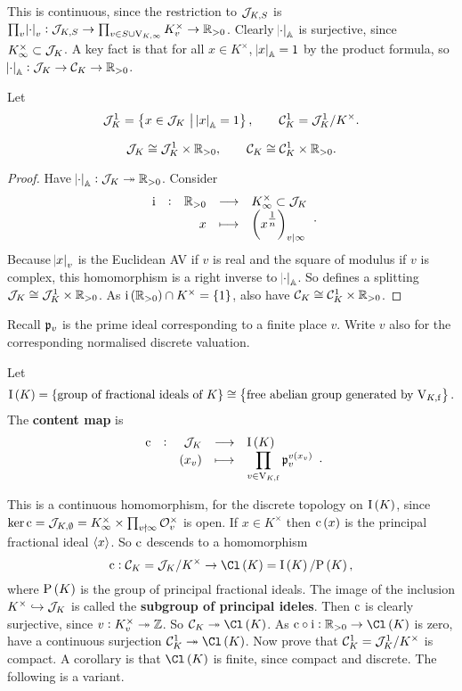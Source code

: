This is continuous, since the restriction to $ \mathcal{J}_{K, S} $ is $ \prod_v \abs{\cdot}_v : \mathcal{J}_{K, S} \to \prod_{v \in S \cup \mathrm{V}_{K, \infty}} K_v^\times \to \mathbb{R}_{> 0} $. Clearly $ \abs{\cdot}_{\mathbb{A}} $ is surjective, since $ K_\infty^\times \subset \mathcal{J}_K $. A key fact is that for all $ x \in K^\times $, $ \abs{x}_{\mathbb{A}} = 1 $ by the product formula, so $ \abs{\cdot}_{\mathbb{A}} : \mathcal{J}_K \to \mathcal{C}_K \to \mathbb{R}_{> 0} $.

\begin{definition*}
Let
$$ \JJJ_K^1 = \cbr{x \in \JJJ_K \st \abs{x}_\AA = 1}, \qquad \CCC_K^1 = \JJJ_K^1 / K^\times. $$
\end{definition*}

\begin{proposition}
$$ \mathcal{J}_K \cong \mathcal{J}_K^1 \times \mathbb{R}_{> 0}, \qquad \mathcal{C}_K \cong \mathcal{C}_K^1 \times \mathbb{R}_{> 0}. $$
\end{proposition}

\begin{proof}
Have $ \abs{\cdot}_{\mathbb{A}} : \mathcal{J}_K \twoheadrightarrow \mathbb{R}_{> 0} $. Consider
$$ \function[\i]{\RR_{> 0}}{K_\infty^\times \subset \JJJ_K}{x}{\br{x^{\tfrac{1}{n}}}_{v \mid \infty}}. $$
Because $ \abs{x}_v $ is the Euclidean AV if $ v $ is real and the square of modulus if $ v $ is complex, this homomorphism is a right inverse to $ \abs{\cdot}_{\mathbb{A}} $. So defines a splitting $ \mathcal{J}_K \cong \mathcal{J}_K^1 \times \mathbb{R}_{> 0} $. As $ \i\br{\RR_{> 0}} \cap K^\times = \cbr{1} $, also have $ \mathcal{C}_K \cong \mathcal{C}_K^1 \times \mathbb{R}_{> 0} $.
\end{proof}

Recall $ \mathfrak{p}_v $ is the prime ideal corresponding to a finite place $ v $. Write $ v $ also for the corresponding normalised discrete valuation.

\begin{definition*}
Let
$$ \I\br{K} = \cbr{\text{group of fractional ideals of} \ K} \cong \cbr{\text{free abelian group generated by} \ \V_{K, \f}}. $$
The \textbf{content map} is
$$ \function[\c]{\JJJ_K}{\I\br{K}}{\br{x_v}}{\prod_{v \in \V_{K, \f}} \ppp_v^{v\br{x_v}}}. $$
\end{definition*}

This is a continuous homomorphism, for the discrete topology on $ \I\br{K} $, since $ \ker \mathrm{c} = \mathcal{J}_{K, \emptyset} = K_\infty^\times \times \prod_{v \nmid \infty} \mathcal{O}_v^\times $ is open. If $ x \in K^\times $ then $ \c\br{x} $ is the principal fractional ideal $ \left\langle x \right\rangle $. So $ \mathrm{c} $ descends to a homomorphism
$$ \c : \CCC_K = \JJJ_K / K^\times \to \Cl\br{K} = \I\br{K} / \P\br{K}, $$
where $ \P\br{K} $ is the group of principal fractional ideals. The image of the inclusion $ K^\times \hookrightarrow \mathcal{J}_K $ is called the \textbf{subgroup of principal ideles}. Then $ \mathrm{c} $ is clearly surjective, since $ v : K_v^\times \twoheadrightarrow \mathbb{Z} $. So $ \CCC_K \twoheadrightarrow \Cl\br{K} $. As $ \c \circ \i : \RR_{> 0} \to \Cl\br{K} $ is zero, have a continuous surjection $ \CCC_K^1 \twoheadrightarrow \Cl\br{K} $. Now prove that $ \mathcal{C}_K^1 = \mathcal{J}_K^1 / K^\times $ is compact. A corollary is that $ \Cl\br{K} $ is finite, since compact and discrete. The following is a variant.

